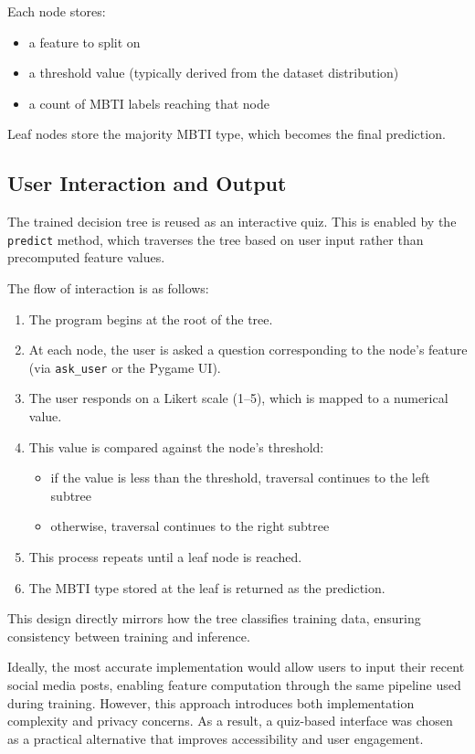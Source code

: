 \documentclass[11pt]{article}
\begin{document}
Each node stores:
\begin{itemize}
    \item a feature to split on
    \item a threshold value (typically derived from the dataset distribution)
    \item a count of MBTI labels reaching that node
\end{itemize}

Leaf nodes store the majority MBTI type, which becomes the final prediction.

\subsection{User Interaction and Output}

The trained decision tree is reused as an interactive quiz. This is enabled by the \texttt{predict} method, which traverses the tree based on user input rather than precomputed feature values.

The flow of interaction is as follows:

\begin{enumerate}
    \item The program begins at the root of the tree.
    \item At each node, the user is asked a question corresponding to the node’s feature (via \texttt{ask\_user} or the Pygame UI).
    \item The user responds on a Likert scale (1–5), which is mapped to a numerical value.
    \item This value is compared against the node’s threshold:
    \begin{itemize}
        \item if the value is less than the threshold, traversal continues to the left subtree
        \item otherwise, traversal continues to the right subtree
    \end{itemize}
    \item This process repeats until a leaf node is reached.
    \item The MBTI type stored at the leaf is returned as the prediction.
\end{enumerate}

This design directly mirrors how the tree classifies training data, ensuring consistency between training and inference.

Ideally, the most accurate implementation would allow users to input their recent social media posts, enabling feature computation through the same pipeline used during training. However, this approach introduces both implementation complexity and privacy concerns. As a result, a quiz-based interface was chosen as a practical alternative that improves accessibility and user engagement.
\end{document}

